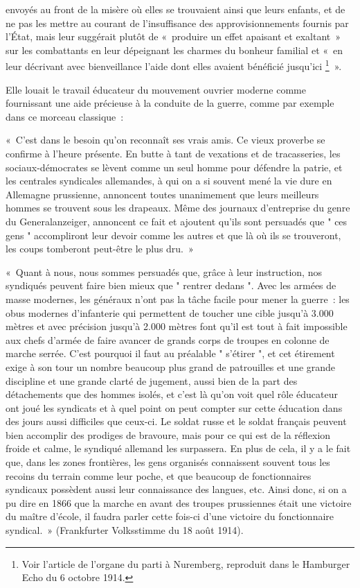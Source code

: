 \documentclass[french,twoside]{book} %
\newenvironment{quoteblock}%
  {\begin{quoting}}
  {\end{quoting}}
\newenvironment{quotebar}{%
    \def\FrameCommand{{\color{rubric!10!}\vrule width 0.5em} \hspace{0.9em}}%
    \def\OuterFrameSep{\itemsep} %
    \MakeFramed {\advance\hsize-\width \FrameRestore}
  }%
  {%
    \endMakeFramed
  }
\renewenvironment{quoteblock}%
  {%
    \savenotes
    \setstretch{0.9}
    \normalfont
    \begin{quotebar}
  }
  {%
    \end{quotebar}
    \spewnotes
  }
\begin{document}
envoyés au front de la misère où elles se trouvaient ainsi que leurs enfants, et de ne pas les mettre au courant de l’insuffisance des approvisionnements fournis par l’État, mais leur suggérait plutôt de « produire un effet apaisant et exaltant » sur les combattants en leur dépeignant les charmes du bonheur familial et « en leur décrivant avec bienveillance l’aide dont elles avaient bénéficié jusqu’ici \footnote{Voir l’article de l’organe du parti à Nuremberg, reproduit dans le Hamburger Echo du 6 octobre 1914.} ».\par
Elle louait le travail éducateur du mouvement ouvrier moderne comme fournissant une aide précieuse à la conduite de la guerre, comme par exemple dans ce morceau classique :\par

\begin{quoteblock}
 \noindent « C'est dans le besoin qu’on reconnaît ses vrais amis. Ce vieux proverbe se confirme à l’heure présente. En butte à tant de vexations et de tracasseries, les sociaux-démocrates se lèvent comme un seul homme pour défendre la patrie, et les centrales syndicales allemandes, à qui on a si souvent mené la vie dure en Allemagne prussienne, annoncent toutes unanimement que leurs meilleurs hommes se trouvent sous les drapeaux. Même des journaux d’entreprise du genre du Generalanzeiger, annoncent ce fait et ajoutent qu’ils sont persuadés que " ces gens " accompliront leur devoir comme les autres et que là où ils se trouveront, les coups tomberont peut-être le plus dru. »\par
 « Quant à nous, nous sommes persuadés que, grâce à leur instruction, nos syndiqués peuvent faire bien mieux que " rentrer dedans ". Avec les armées de masse modernes, les généraux n’ont pas la tâche facile pour mener la guerre : les obus modernes d’infanterie qui permettent de toucher une cible jusqu’à 3.000 mètres et avec précision jusqu’à 2.000 mètres font qu’il est tout à fait impossible aux chefs d’armée de faire avancer de grands corps de troupes en colonne de marche serrée. C'est pourquoi il faut au préalable " s’étirer ", et cet étirement exige à son tour un nombre beaucoup plus grand de patrouilles et une grande discipline et une grande clarté de jugement, aussi bien de la part des détachements que des hommes isolés, et c’est là qu’on voit quel rôle éducateur ont joué les syndicats et à quel point on peut compter sur cette éducation dans des jours aussi difficiles que ceux-ci. Le soldat russe et le soldat français peuvent bien accomplir des prodiges de bravoure, mais pour ce qui est de la réflexion froide et calme, le syndiqué allemand les surpassera. En plus de cela, il y a le fait que, dans les zones frontières, les gens organisés connaissent souvent tous les recoins du terrain comme leur poche, et que beaucoup de fonctionnaires syndicaux possèdent aussi leur connaissance des langues, etc. Ainsi donc, si on a pu dire en 1866 que la marche en avant des troupes prussiennes était une victoire du maître d’école, il faudra parler cette fois-ci d’une victoire du fonctionnaire syndical. » (Frankfurter Volksstimme du 18 août 1914).
\end{quoteblock}
\end{document}
